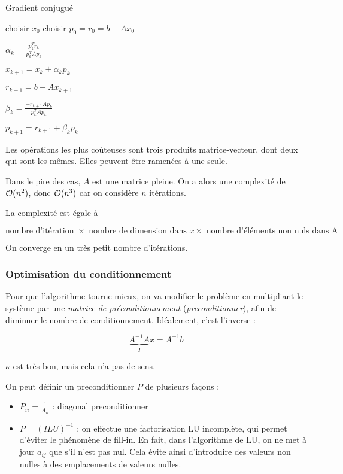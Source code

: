 \begin{algorithm}
\caption{Gradient conjugué}
\begin{algorithmic}
\STATE choisir $x_0$
\STATE choisir $p_0 = r_0 = b - Ax_0$


	\STATE $\alpha_k = \frac{p_k^Tr_k}{p_k^TAp_k}$
		
	\STATE $x_{k + 1} = x_k + \alpha_kp_k$
	
	\STATE $r_{k + 1} = b - Ax_{k + 1}$
	
	\STATE $\beta_k = \frac{-r_{k + 1}Ap_k}{p_k^TAp_k}$
	
	\STATE $p_{k + 1} = r_{k + 1} + \beta_k p_k$
\ENDFOR
\end{algorithmic}
\end{algorithm}

		Les opérations les plus coûteuses sont trois produits matrice-vecteur, dont deux qui sont les mêmes. Elles peuvent être ramenées à une seule.
		
		Dans le pire des cas, $A$ est une matrice pleine. On a alors une complexité de $\mathcal{O}(n^2)$, donc $\mathcal{O}(n^3)$ car on considère $n$ itérations.
		
		La complexité est égale à
		
		$$\text{nombre d'itération } \times \text{ nombre de dimension dans } x \times \text{ nombre d'éléments non nuls dans A}$$
		
		On converge en un très petit nombre d'itérations.
		
		\subsubsection{Optimisation du conditionnement}
		
		Pour que l'algorithme tourne mieux, on va modifier le problème en multipliant le système par une \textit{matrice de préconditionnement} (\textit{preconditionner}), afin de diminuer le nombre de conditionnement. Idéalement, c'est l'inverse :
		
		$$\underbrace{A^{-1}A}_Ix = A^{-1}b$$
		
		$\kappa$ est très bon, mais cela n'a pas de sens.
		
		On peut définir un preconditionner $P$ de plusieurs façons :
		
		\begin{itemize}
			\item $P_{ii} = \frac{1}{A_{ii}}$ : diagonal preconditionner
			\item $P = (ILU)^{-1}$ : on effectue une factorisation LU incomplète, qui permet d'éviter le phénomène de fill-in. En fait, dans l'algorithme de LU, on ne met à jour $a_{i j}$ que s'il n'est pas nul. Cela évite ainsi d'introduire des valeurs non nulles à des emplacements de valeurs nulles. 
		\end{itemize}
		
